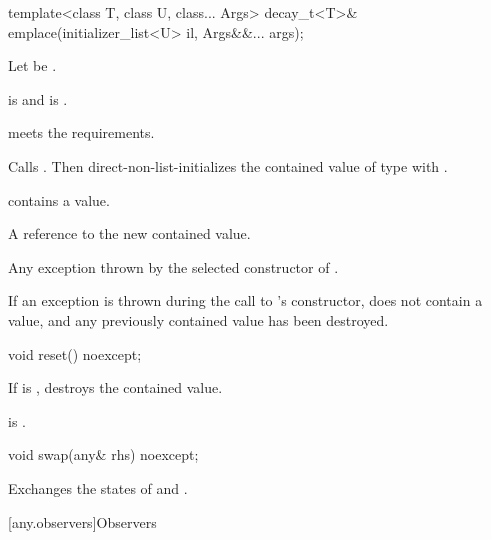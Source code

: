 %
\begin{itemdecl}
template<class T, class U, class... Args>
  decay_t<T>& emplace(initializer_list<U> il, Args&&... args);
\end{itemdecl}

\begin{itemdescr}
\pnum
Let  be .

\pnum
\constraints
{} is  and
 is .

\pnum
\expects
{} meets the  requirements.

\pnum
\effects
Calls . Then direct-non-list-initializes the contained value
of type  with .

\pnum
\ensures
{} contains a value.

\pnum
\returns
A reference to the new contained value.

\pnum
\throws
Any exception thrown by the selected constructor of .

\pnum
\remarks
If an exception is thrown during the call to 's constructor,
 does not contain a value, and any previously contained value
has been destroyed.
\end{itemdescr}

%
\begin{itemdecl}
void reset() noexcept;
\end{itemdecl}

\begin{itemdescr}
\pnum
\effects
If  is , destroys the contained value.

\pnum
\ensures
{} is .
\end{itemdescr}

%
\begin{itemdecl}
void swap(any& rhs) noexcept;
\end{itemdecl}

\begin{itemdescr}

\pnum
\effects
Exchanges the states of  and .
\end{itemdescr}

[any.observers]{Observers}

